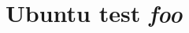\documentclass[a4paper]{article}
\begin{document}
\noindent
\parbox[t]{\dimexpr.5\linewidth-1ex\relax}
{%
  \section{Ubuntu test \textit{foo}}

  \lipsum[1]\textit{\lipsum[1]}

  \selectfont\lipsum[1]\textit{\lipsum[1]}
}
\hfill
\end{document}
